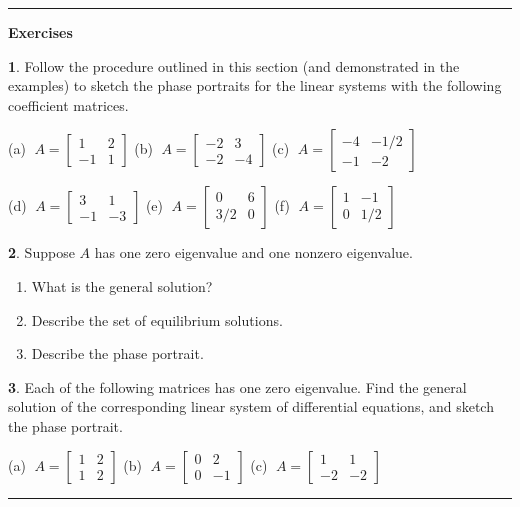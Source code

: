 \documentclass[reqno]{immbook}
\newcommand{\ds}{\displaystyle}
\numberwithin{equation}{chapter}
\numberwithin{question}{section}
\numberwithin{theorem}{chapter}
\numberwithin{figure}{chapter}
\theoremstyle{definition}
\newtheorem{exercise}{}[section]
\newenvironment{exercises}%
{%
\medskip\hrule\medskip\noindent\textbf{Exercises}%
}%
{%
\medskip\hrule
}
\begin{document}
\begin{exercises}
\begin{exercise}
Follow the procedure outlined in this section (and demonstrated
in the examples) to sketch the phase portraits for the linear
systems with the following coefficient matrices.

\smallskip
(a) $\ds \; A = \begin{bmatrix} 1 & 2 \\ -1 & 1 \end{bmatrix}$
\hspace{1cm}
(b) $\ds \; A = \begin{bmatrix} -2 & 3 \\ -2 & -4 \end{bmatrix}$
\hspace{1cm}
(c) $\ds \; A = \begin{bmatrix} -4 & -1/2 \\ -1 & -2 \end{bmatrix}$ 

\smallskip
(d) $\ds \; A = \begin{bmatrix} 3 & 1 \\ -1 & -3 \end{bmatrix}$ 
\hspace{0.75cm}
(e) $\ds \; A = \begin{bmatrix} 0 & 6 \\ 3/2 & 0 \end{bmatrix}$
\hspace{1.2cm}
(f) $\ds \; A = \begin{bmatrix} 1 & -1 \\ 0 & 1/2 \end{bmatrix}$ 
\end{exercise}
\begin{exercise}
Suppose $A$ has one zero eigenvalue and one nonzero eigenvalue.
\begin{enumerate}
\item[(a)] What is the general solution?
\item[(b)] Describe the set of equilibrium solutions.
\item[(c)] Describe the phase portrait.
\end{enumerate}
\end{exercise}
\begin{exercise}
Each of the following matrices has one zero eigenvalue.
Find the general solution of the corresponding linear system of
differential equations, and sketch the phase portrait.

\smallskip
(a) $\ds \; A = \begin{bmatrix} 1 & 2 \\ 1 & 2 \end{bmatrix}$
\hspace{1cm}
(b) $\ds \; A = \begin{bmatrix} 0 & 2 \\ 0 & -1 \end{bmatrix}$
\hspace{1cm}
(c) $\ds \; A = \begin{bmatrix} 1 & 1 \\ -2 & -2 \end{bmatrix}$
\end{exercise}
\end{exercises}
%
\newpage
%
\end{document}
